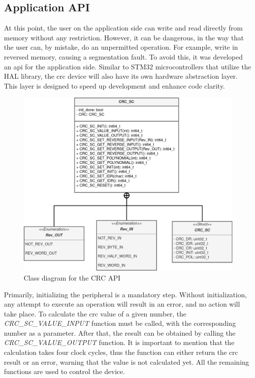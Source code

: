 \subsection{Application API}

At this point, the user on the application side can write and read directly from memory without any restriction. However, it can be
dangerous, in the way that the user can, by mistake, do an unpermitted operation. For example, write in reversed memory, causing a
segmentation fault. To avoid this, it was developed an \gls{api} for the application side. Similar to STM32 microcontrollers that 
utilize the HAL library, the \gls{crc} device will also have its own hardware abstraction layer. This layer is designed to speed up 
development and enhance code clarity.

\begin{figure}[H]
	\centering
 	\includegraphics[width=0.7\linewidth]{Images/CRC_API_Class_Diagram.png} 
 	\caption{Class diagram for the CRC API}
\end{figure}

Primarily, initializing the peripheral is a mandatory step. Without initialization, any attempt to execute an operation will 
result in an error, and no action will take place. To calculate the \gls{crc} value of a given number, the \textit{CRC\_SC\_VALUE\_INPUT} \space
function must be called, with the corresponding number as a parameter. After that, the result can be obtained by calling the 
\textit{CRC\_SC\_VALUE\_OUTPUT} \space function. It is important to mention that the calculation takes four clock cycles, thus the function can 
either return the \gls{crc} result or an error, warning that the value is not calculated yet. All the remaining functions are used to
control the device.

